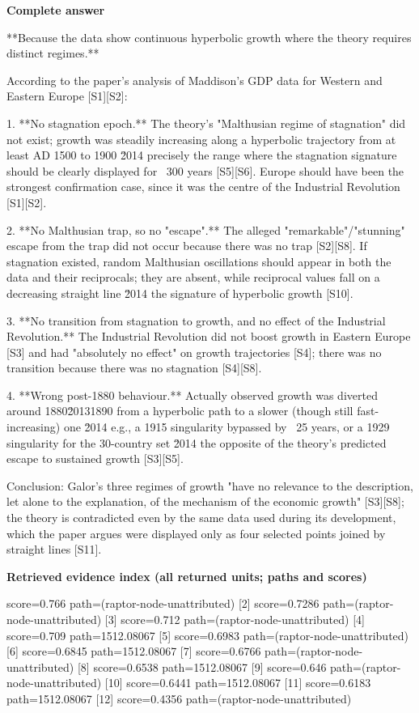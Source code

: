 \documentclass[10pt]{article}
\begin{document}
\textbf{Complete answer}
\begin{AnswerText}
**Because the data show continuous hyperbolic growth where the theory requires distinct regimes.**

According to the paper's analysis of Maddison's GDP data for Western and Eastern Europe [S1][S2]:

1. **No stagnation epoch.** The theory's "Malthusian regime of stagnation" did not exist; growth was steadily increasing along a hyperbolic trajectory from at least AD 1500 to 1900 \u2014 precisely the range where the stagnation signature should be clearly displayed for ~300 years [S5][S6]. Europe should have been the strongest confirmation case, since it was the centre of the Industrial Revolution [S1][S2].

2. **No Malthusian trap, so no "escape".** The alleged "remarkable"/"stunning" escape from the trap did not occur because there was no trap [S2][S8]. If stagnation existed, random Malthusian oscillations should appear in both the data and their reciprocals; they are absent, while reciprocal values fall on a decreasing straight line \u2014 the signature of hyperbolic growth [S10].

3. **No transition from stagnation to growth, and no effect of the Industrial Revolution.** The Industrial Revolution did not boost growth in Eastern Europe [S3] and had "absolutely no effect" on growth trajectories [S4]; there was no transition because there was no stagnation [S4][S8].

4. **Wrong post-1880 behaviour.** Actually observed growth was diverted around 1880\u20131890 from a hyperbolic path to a slower (though still fast-increasing) one \u2014 e.g., a 1915 singularity bypassed by ~25 years, or a 1929 singularity for the 30-country set \u2014 the opposite of the theory's predicted escape to sustained growth [S3][S5].

Conclusion: Galor's three regimes of growth "have no relevance to the description, let alone to the explanation, of the mechanism of the economic growth" [S3][S8]; the theory is contradicted even by the same data used during its development, which the paper argues were displayed only as four selected points joined by straight lines [S11].
\end{AnswerText}

\textbf{Retrieved evidence index (all returned units; paths and scores) }
\begin{EvidenceText}
[1] score=0.766 path=(raptor-node-unattributed)
[2] score=0.7286 path=(raptor-node-unattributed)
[3] score=0.712 path=(raptor-node-unattributed)
[4] score=0.709 path=1512.08067
[5] score=0.6983 path=(raptor-node-unattributed)
[6] score=0.6845 path=1512.08067
[7] score=0.6766 path=(raptor-node-unattributed)
[8] score=0.6538 path=1512.08067
[9] score=0.646 path=(raptor-node-unattributed)
[10] score=0.6441 path=1512.08067
[11] score=0.6183 path=1512.08067
[12] score=0.4356 path=(raptor-node-unattributed)
\end{EvidenceText}
\end{document}
